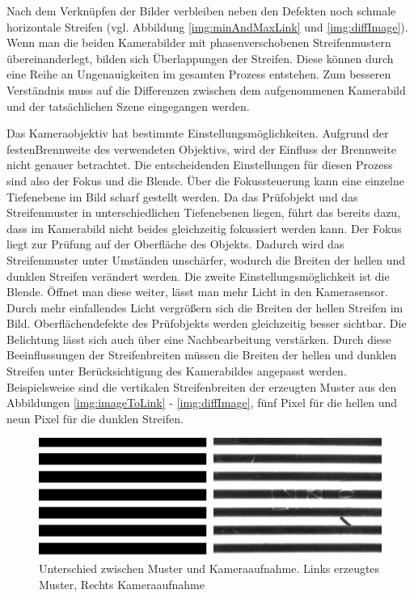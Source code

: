 Nach dem Verknüpfen der Bilder verbleiben neben den Defekten noch schmale horizontale Streifen (vgl. Abbildung \ref{img:minAndMaxLink} und \ref{img:diffImage}).
Wenn man die beiden Kamerabilder mit phasenverschobenen Streifenmustern übereinanderlegt, bilden sich Überlappungen der Streifen.
Diese können durch eine Reihe an Ungenauigkeiten im gesamten Prozess entstehen.
Zum besseren Verständnis muss auf die Differenzen zwischen dem aufgenommenen Kamerabild und der tatsächlichen Szene eingegangen werden.

\p
Das Kameraobjektiv hat bestimmte Einstellungsmöglichkeiten.
Aufgrund der festen\linebreak Brennweite des verwendeten Objektivs, wird der Einfluss der Brennweite nicht genauer betrachtet.
Die entscheidenden Einstellungen für diesen Prozess sind also der Fokus und die Blende.
Über die Fokussteuerung kann eine einzelne Tiefenebene im Bild scharf gestellt werden.
Da das Prüfobjekt und das Streifenmuster in unterschiedlichen Tiefenebenen liegen, führt das bereits dazu, dass im Kamerabild nicht beides gleichzeitig fokussiert werden kann.
Der Fokus liegt zur Prüfung auf der Oberfläche des Objekts.
Dadurch wird das Streifenmuster unter Umständen unschärfer, wodurch die Breiten der hellen und dunklen Streifen verändert werden.
Die zweite Einstellungsmöglichkeit ist die Blende.
Öffnet man diese weiter, lässt man mehr Licht in den Kamerasensor.
Durch mehr einfallendes Licht vergrößern sich die Breiten der hellen Streifen im Bild. 
Oberflächendefekte des Prüfobjekts werden gleichzeitig besser sichtbar.
Die Belichtung lässt sich auch über eine Nachbearbeitung verstärken.
Durch diese Beeinflussungen der Streifenbreiten müssen die Breiten der hellen und dunklen Streifen unter Berücksichtigung des Kamerabildes angepasst werden.
Beispielsweise sind die vertikalen Streifenbreiten der erzeugten Muster aus den Abbildungen \ref{img:imageToLink} - \ref{img:diffImage}, fünf Pixel für die hellen und neun Pixel für die dunklen Streifen.

\begin{figure}[H]
	\centering
	\includegraphics[width=\textwidth]{03_sichtpruefungDurchLichtreflexionen/optimierungen/figures/differenceCameraPattern}
	\caption[Unterschied zwischen Muster und Kameraaufnahme]{Unterschied zwischen Muster und Kameraaufnahme. Links erzeugtes Muster, Rechts Kameraaufnahme}
	\label{img:differenceCamPat}
\end{figure}

